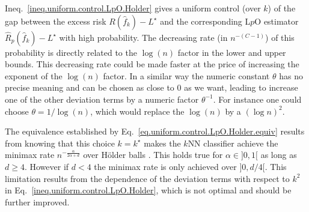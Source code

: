 \documentclass[twoside,11pt]{article}
\numberwithin{equation}{section}
\newcommand{\1}{\mathds{1}}%
\newcommand{\paren}[1]{\left( #1 \right)}
\newcommand{\Rh}{\widehat{R}}
\newcommand{\Rhp}{\Rh_p}
\numberwithin{equation}{section}
\theoremstyle{plain}
\begin{document}
%
Ineq.~\eqref{ineq.uniform.control.LpO.Holder} gives a uniform control (over $k$) of the gap between the excess risk	 $R(\hat{f}_{k}) - L^\star $ and the corresponding L$p$O estimator $ \Rhp(\hat{f}_{k}) - L^\star$ with high probability.
%
The decreasing rate (in $n^{-(C-1)}$) of this probability is directly related to the $\log(n)$ factor in the lower and upper bounds. This decreasing rate could be made faster at the price of increasing the exponent of the $\log(n)$ factor.
%
In a similar way the numeric constant $\theta$ has no precise meaning and can be chosen as close to 0 as we want, leading to increase one of the other deviation terms by a numeric factor $\theta^{-1}$. For instance one could choose $\theta=1/\log(n)$, which would replace the $\log(n)$ by a $\paren{\log n}^2$.

 {The equivalence established by Eq.~\eqref{eq.uniform.control.LpO.Holder.equiv} results from knowing that this choice $k=k^\star$ makes the $k$NN classifier achieve the minimax rate $n^{-\frac{\alpha}{2\alpha+d}}$ over H\"older balls \citep{Yang_1999}.
	This holds true for $\alpha \in ]0,1[$ as long as $d\geq 4$.
	However if $d<4$ the minimax rate is only achieved over $]0,d/4[$.
	This limitation results from the dependence of the deviation terms with respect to $k^2$ in Eq.~\eqref{ineq.uniform.control.LpO.Holder}, which is not optimal and should be further improved.}

\end{document}
